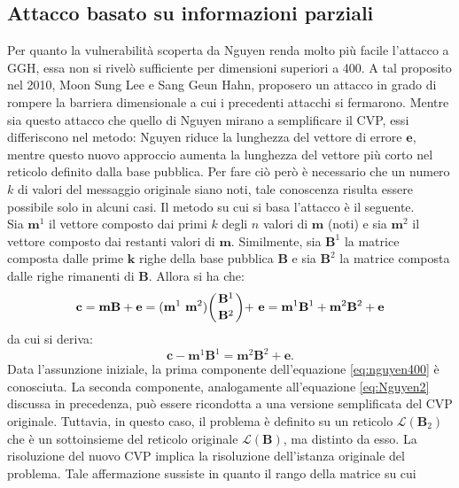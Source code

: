 \subsection{Attacco basato su informazioni parziali}
Per quanto la vulnerabilità scoperta da Nguyen renda molto più facile l'attacco a GGH, essa
non si rivelò sufficiente per dimensioni superiori a 400. A tal proposito nel 2010, Moon Sung Lee 
e Sang Geun Hahn\cite{Nguyen400}, proposero un attacco in grado di rompere la barriera 
dimensionale a cui i precedenti attacchi si fermarono. Mentre sia questo attacco che quello 
di Nguyen mirano a semplificare il CVP, essi differiscono nel metodo: 
Nguyen riduce la lunghezza del vettore di errore $\mathbf{e}$, mentre questo nuovo approccio 
aumenta la lunghezza del vettore più corto nel reticolo definito dalla base pubblica.
Per fare ciò però è necessario che un numero $k$ di valori del messaggio originale siano noti,
tale conoscenza risulta essere possibile solo in alcuni casi. Il metodo su cui si basa
l'attacco è il seguente.\\
Sia $\mathbf{m}^1$ il vettore composto dai primi $k$ degli $n$ valori di $\mathbf{m}$ (noti) e
sia $\mathbf{m}^2$ il vettore composto dai restanti valori di $\mathbf{m}$. Similmente, sia 
$\mathbf{B}^1$ la matrice composta dalle prime $\mathbf{k}$ righe della base
pubblica $\mathbf{B}$ e sia $\mathbf{B}^2$ la matrice composta dalle righe rimanenti di
$\mathbf{B}$. Allora si ha che:
\begin{equation*}
    \mathbf{c} = \mathbf{m}\mathbf{B} + \mathbf{e} =
    (\mathbf{m}^1 \ \mathbf{m}^2)\biggl(\genfrac{}{}{0pt}{}{\mathbf{B}^1}{\mathbf{B}^2}\biggl) + \ \mathbf{e}
    = \mathbf{m}^1\mathbf{B}^1 + \mathbf{m}^2\mathbf{B}^2 + \mathbf{e}
\end{equation*}
da cui si deriva:
\begin{equation}
    \label{eq:nguyen400}
    \mathbf{c} - \mathbf{m}^1\mathbf{B}^1 = \mathbf{m}^2\mathbf{B}^2 + \mathbf{e}.
\end{equation}
Data l'assunzione iniziale, la prima componente dell'equazione \ref{eq:nguyen400} è conosciuta. 
La seconda componente, analogamente all'equazione \ref{eq:Nguyen2} discussa in precedenza, 
può essere ricondotta a una versione semplificata del CVP originale. 
Tuttavia, in questo caso, il problema è definito su un reticolo $\mathcal{L}(\mathbf{B}_2)$ 
che è un sottoinsieme del reticolo originale $\mathcal{L}(\mathbf{B})$, ma distinto da esso. 
La risoluzione del nuovo CVP implica la risoluzione dell'istanza 
originale del problema. Tale affermazione sussiste in quanto il rango della matrice su cui
